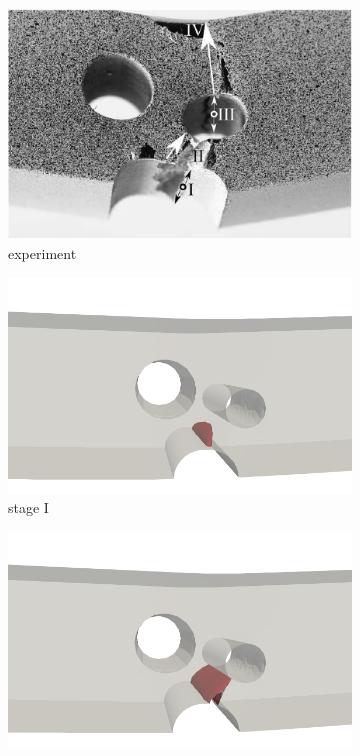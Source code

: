 \begin{figure}[!htb]
  \centering
  \begin{subfigure}{0.33\textwidth}
    \centering
    \includegraphics[width=\textwidth,scale=0.5]{Chapter5/figures/3pb/1234}
    \caption{experiment}
    \label{fig: Chapter5/3pb/1234/experiment}
  \end{subfigure}
  \hfill
  \begin{minipage}{0.6\textwidth}
    \begin{subfigure}{0.45\textwidth}
      \centering
      \includegraphics[width=\linewidth]{Chapter5/figures/3pb/I}
      \caption{stage I}
      \label{fig: Chapter5/3pb/1234/simulation_I}
    \end{subfigure}
    \begin{subfigure}{0.45\textwidth}
      \centering
      \includegraphics[width=\linewidth]{Chapter5/figures/3pb/II}

\end{subfigure}
\end{minipage}
\end{figure}
